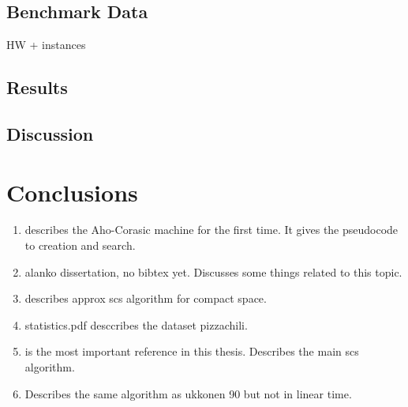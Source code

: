 \documentclass[english,twoside,censored,csm,algorithms-track-2020]{HYthesisML}
\theoremstyle{plain}
\theoremstyle{definition}
\begin{document}
\begin{lemma}[]
  \section{Benchmark Data}
  HW + instances

  \section{Results}

  \section{Discussion}

%
\chapter{Conclusions}
  

  \begin{enumerate}
  \item \citep{aho75} describes the Aho-Corasic machine for the first time. It gives the pseudocode to creation and search.
  \item alanko dissertation, no bibtex yet. Discusses some things related to this topic.
  \item \citep{alanko17} describes approx scs algorithm for compact space.
  \item statistics.pdf desccribes the dataset pizzachili.
  \item \citep{ukkonen90} is the most important reference in this thesis. Describes the main scs algorithm.
  \item \citep{tarhio88} Describes the same algorithm as ukkonen 90 but not in linear time.
  \end{enumerate}











\cleardoublepage                          %
{}  %
\printbibliography

\backmatter

%
%
%

\begin{appendices}


\end{appendices}
\end{lemma}
\end{document}
